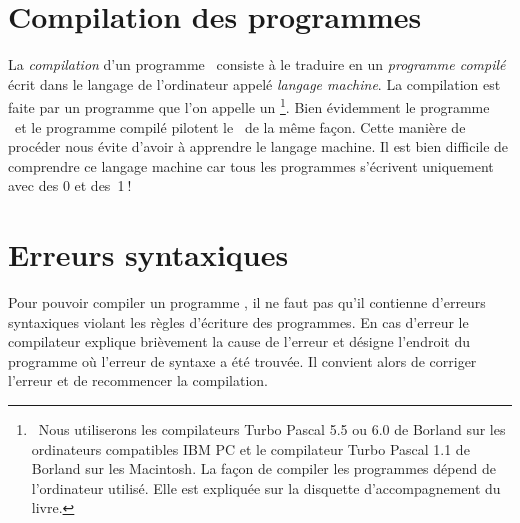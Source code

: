 \section{Compilation des programmes} 
La {\em compilation} d'un programme \pascal\ consiste à le traduire en
un {\em programme compilé} écrit dans le langage de l'or\-di\-na\-teur
appelé {\em langage machine}. La compilation est faite par un programme
que l'on appelle un \@\footnote{\ Nous utiliserons les 
compilateurs Turbo Pascal 5.5 ou 6.0 de Borland sur les or\-di\-na\-teurs compatibles 
IBM PC et le compilateur Turbo Pascal 1.1 de Borland sur les Macintosh.
La façon de compiler les programmes dépend de l'or\-di\-na\-teur
utilisé. Elle est expliquée sur la disquette
d'accompagnement du livre.}.
Bien évidemment le programme \pascal\ et le programme compilé pilotent
le \robot\ de la même façon. Cette manière de procéder nous 
évite d'avoir à apprendre le langage machine. Il est bien difficile
de comprendre ce langage machine car tous les programmes s'écrivent
uniquement avec des 0 et \hbox{des 1$\:$!}

\section{Erreurs syntaxiques} 

Pour pouvoir compiler un programme \pascal, il ne faut pas qu'il contienne
d'erreurs syntaxiques violant les règles
d'écriture des programmes. En cas d'erreur le compilateur explique 
brièvement la cause de l'erreur et désigne l'endroit du programme
où l'er\-reur de syntaxe a été trouvée. Il convient alors de
corriger l'erreur et de recommencer la compilation.

